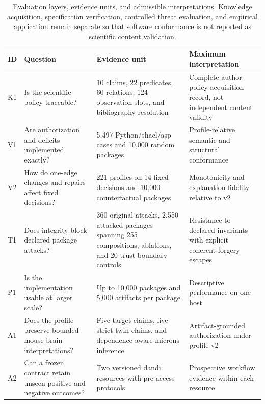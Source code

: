 \begin{table}[!htbp]
\centering
\caption{Evaluation layers, evidence units, and admissible interpretations. Knowledge acquisition, specification verification, controlled threat evaluation, and empirical application remain separate so that software conformance is not reported as scientific content validation.}
\label{tab:experiment-design-v2}
\footnotesize
\renewcommand{\arraystretch}{1.10}
\begin{tabularx}{\textwidth}{@{}P{0.06\textwidth}P{0.25\textwidth}P{0.29\textwidth}Y@{}}
\toprule
ID & Question & Evidence unit & Maximum interpretation \\
\midrule
K1 & Is the scientific policy traceable? & 10 claims, 22 predicates, 60 relations, 124 observation slots, and bibliography resolution & Complete author-policy acquisition record, not independent content validity \\
V1 & Are authorization and deficits implemented exactly? & 5,497 Python/\ac{shacl}/\ac{asp} cases and 10,000 random packages & Profile-relative semantic and structural conformance \\
V2 & How do one-edge changes and repairs affect fixed decisions? & 221 profiles on 14 fixed decisions and 10,000 counterfactual packages & Monotonicity and explanation fidelity relative to v2 \\
T1 & Does integrity block declared package attacks? & 360 original attacks, 2,550 attacked packages spanning 255 compositions, ablations, and 20 trust-boundary controls & Resistance to declared invariants with explicit coherent-forgery escapes \\
P1 & Is the implementation usable at larger scale? & Up to 10,000 packages and 5,000 artifacts per package & Descriptive performance on one host \\
A1 & Does the profile preserve bounded mouse-brain interpretations? & Five target claims, five strict twin claims, and dependence-aware \ac{microns} inference & Artifact-grounded authorization under profile v2 \\
A2 & Can a frozen contract retain unseen positive and negative outcomes? & Two versioned \ac{dandi} resources with pre-access protocols & Prospective workflow evidence within each resource \\
\bottomrule
\end{tabularx}
\end{table}
